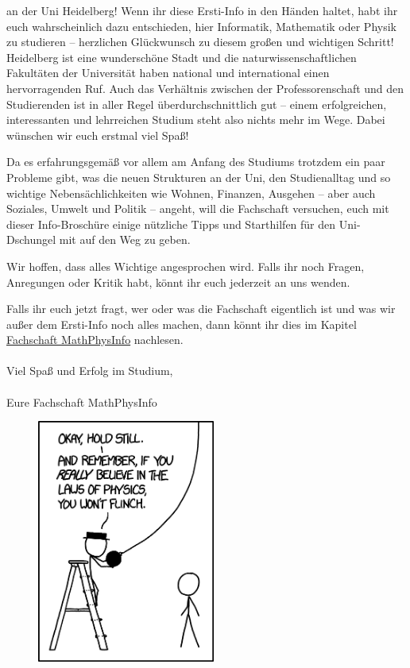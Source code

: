 
an der Uni Heidelberg! Wenn ihr diese Ersti-Info in den Händen haltet, habt ihr euch wahrscheinlich dazu entschieden, hier Informatik, Mathematik oder Physik zu studieren -- herzlichen Glückwunsch zu diesem großen und wichtigen Schritt! Heidelberg ist eine wunderschöne Stadt und die naturwissenschaftlichen Fakultäten der Universität haben national und international einen hervorragenden Ruf. Auch das Verhältnis zwischen der Professorenschaft und den Studierenden ist in aller Regel überdurchschnittlich gut -- einem erfolgreichen, interessanten und lehrreichen Studium steht also nichts mehr im Wege. Dabei wünschen wir euch erstmal viel Spaß! \smiley

Da es erfahrungsgemäß vor allem am Anfang des Studiums trotzdem ein paar Probleme gibt, was die neuen Strukturen an der Uni, den Studienalltag und so wichtige Nebensächlichkeiten wie Wohnen, Finanzen, Ausgehen -- aber auch Soziales, Umwelt und Politik -- angeht, will die Fachschaft versuchen, euch mit dieser Info-Broschüre einige nützliche Tipps und Starthilfen für den Uni-Dschungel mit auf den Weg zu geben.

\vfill
\eject

Wir hoffen, dass alles Wichtige angesprochen wird. Falls ihr noch Fragen, Anregungen oder Kritik habt, könnt ihr euch jederzeit an uns wenden.

Falls ihr euch jetzt fragt, wer oder was die Fachschaft eigentlich ist und was wir außer dem Ersti-Info noch alles machen, dann könnt ihr dies im Kapitel \hyperref[diefsmathphys]{Fachschaft MathPhysInfo} nachlesen. \\\\

\noindent Viel Spaß und Erfolg im Studium,\\\\

Eure Fachschaft MathPhysInfo


\begin{figure}[b]
\centering
\includegraphics[height=8cm]{bilder/laws_of_physics_2x.png}
\end{figure}
